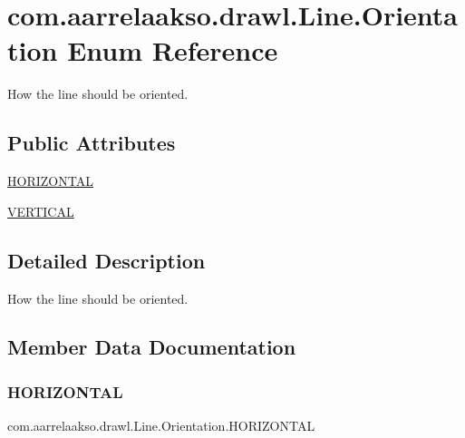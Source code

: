 \hypertarget{enumcom_1_1aarrelaakso_1_1drawl_1_1_line_1_1_orientation}{}\section{com.\+aarrelaakso.\+drawl.\+Line.\+Orientation Enum Reference}
\label{enumcom_1_1aarrelaakso_1_1drawl_1_1_line_1_1_orientation}


How the line should be oriented.  


\subsection*{Public Attributes}
\begin{DoxyCompactItemize}
\item 
\hyperlink{enumcom_1_1aarrelaakso_1_1drawl_1_1_line_1_1_orientation_a8400c9a90a482778ae963b47fca3ec1f}{H\+O\+R\+I\+Z\+O\+N\+T\+AL}
\item 
\hyperlink{enumcom_1_1aarrelaakso_1_1drawl_1_1_line_1_1_orientation_ae5abbefd554c0775da068445e8bd65ae}{V\+E\+R\+T\+I\+C\+AL}
\end{DoxyCompactItemize}


\subsection{Detailed Description}
How the line should be oriented. 

\subsection{Member Data Documentation}
\mbox{\label{enumcom_1_1aarrelaakso_1_1drawl_1_1_line_1_1_orientation_a8400c9a90a482778ae963b47fca3ec1f}} 
\subsubsection{\texorpdfstring{H\+O\+R\+I\+Z\+O\+N\+T\+AL}{HORIZONTAL}}
{\footnotesize\ttfamily com.\+aarrelaakso.\+drawl.\+Line.\+Orientation.\+H\+O\+R\+I\+Z\+O\+N\+T\+AL}

